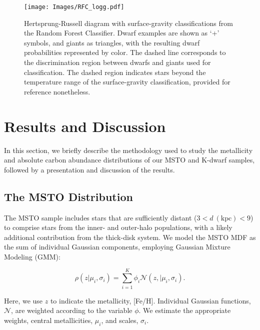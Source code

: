 \documentclass[twocolumn,trackchanges]{aastex63}
\begin{document}
\begin{figure}
	\centering
	\texttt{[image: Images/RFC\_logg.pdf]}
	
	\caption{Hertsprung-Russell diagram with surface-gravity classifications from the Random Forest Classifier. Dwarf examples are shown as `+' symbols, and giants as triangles, with the resulting dwarf probabilities represented by color. The dashed line corresponds to the discrimination region between dwarfs and giants used for classification. The dashed region indicates stars beyond the temperature range of the surface-gravity classification, provided for reference nonetheless. 
	\label{fig:RFC_logg}}
\end{figure}



\section{Results and Discussion}\label{section:results}

In this section, we briefly describe the methodology used to study the metallicity and absolute carbon abundance distributions of our MSTO and K-dwarf samples, followed by a presentation and discussion of the results.

\subsection{The MSTO Distribution}

The MSTO sample includes stars that are sufficiently distant ($3 < d~(\textrm{kpc}) < 9$) to comprise stars from the inner- and outer-halo populations, with a likely additional contribution from the thick-disk system. We model the MSTO MDF as the sum of individual Gaussian components, employing Gaussian Mixture Modeling (GMM):
    
\begin{equation}
\rho(z | \mu_i, \sigma_i) = \sum_{i=1}^{K} \phi_{i}\mathcal{N}(z, | \mu_i, \sigma_i).
\end{equation}  

\noindent Here, we use $z$ to indicate the metallicity, [Fe/H]. Individual Gaussian functions, $\mathcal{N}$, are weighted according to the variable $\phi$. We estimate the appropriate weights, central metallicities, $\mu_i$, and scales, $\sigma_i$. 
    
\end{document}
